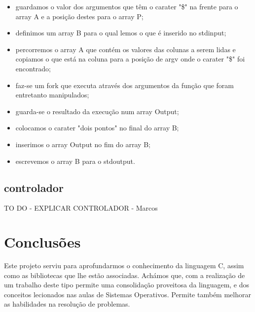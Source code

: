 \documentclass[a4paper]{article}
\begin{document}
\begin{itemize}
\item guardamos o valor dos argumentos que têm o carater "\$" na frente para o array A e a posição destes para o array P;
\item definimos um array B para o qual lemos o que é inserido no stdinput;
\item percorremos o array A que contém os valores das colunas a serem lidas e copiamos o que está na coluna para a posição de argv onde o carater "\$" foi encontrado;
\item faz-se um fork que executa através dos argumentos da função que foram entretanto manipulados; 
\item guarda-se o resultado da execução num array Output;
\item colocamos o carater "dois pontos" no final do array B;
\item inserimos o array Output no fim do array B;
\item escrevemos o array B para o stdoutput.
\end{itemize}

\subsection{controlador}
TO DO - EXPLICAR CONTROLADOR - Marcos


\section{Conclusões}
\label{sec:conclusao}
Este projeto serviu para aprofundarmos o conhecimento da linguagem C, assim como as bibliotecas que lhe estão associadas. Achámos que, com a realização de um trabalho deste tipo permite uma consolidação proveitosa da linguagem, e dos conceitos lecionados nas aulas de Sistemas Operativos. Permite também melhorar as habilidades na resolução de problemas.
\end{document}
